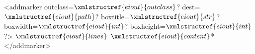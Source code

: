 <addmarker outclass=$\xmlstructref{eiout}{outclass}$? dest=$\xmlstructref{eiout}{path}$? boxtitle=$\xmlstructref{eiout}{str}$? boxwidth=$\xmlstructref{eiout}{int}$? boxheight=$\xmlstructref{eiout}{int}$?>
  $\xmlstructref{eiout}{lines}$
  $\xmlstructref{eiout}{content}$*
</addmarker>
